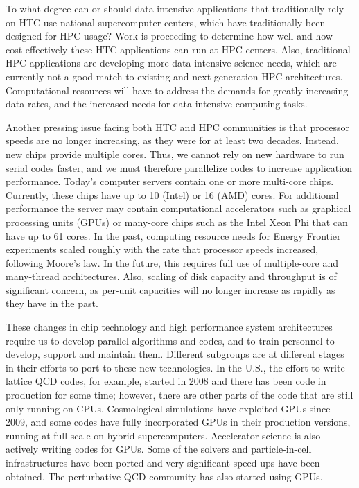 To what degree can or should data-intensive applications that traditionally 
rely on HTC use national supercomputer centers, which have traditionally 
been designed for HPC usage?
Work is proceeding to determine how well and how cost-effectively these HTC
applications can run at HPC centers.
Also, traditional HPC applications are developing more data-intensive
science needs, which are currently not a good match to existing
and next-generation HPC architectures. Computational resources will have to
address the demands for greatly increasing data rates, and the increased
needs for data-intensive computing tasks.

Another pressing issue facing both HTC and HPC communities is that
processor speeds are no longer increasing, as they were for
at least two decades. Instead, new chips provide multiple
cores. Thus, we cannot rely on new hardware to run serial codes faster, and
we must therefore parallelize codes to increase application performance. 
Today's computer servers contain one or more multi-core chips.  Currently,
these chips  have up to 10 (Intel) or 16 (AMD) cores. 
For additional performance the server may contain
computational accelerators such as graphical processing
units (GPUs) or many-core chips such as the Intel Xeon Phi that can have up
to 61 cores. 
In the past, computing resource needs for Energy Frontier experiments scaled
roughly with the rate that processor speeds increased, following Moore's
law. In the future, this requires full use of multiple-core and many-thread 
architectures. Also,
scaling of disk capacity and throughput is of
significant concern, as per-unit capacities will no longer increase as rapidly
as they have in the past.

These changes in chip technology and high performance system architectures
require us to develop parallel algorithms and codes, and to train personnel
to develop, support and maintain them. Different subgroups are at different
stages in their efforts to port to these new technologies. 
In the U.S., the effort to write lattice QCD codes, for
example, started in 2008 and there has been code in
production for some time; however, there
are other parts of the code that are still only running on CPUs.
Cosmological simulations have exploited GPUs since 2009, and some 
codes have fully incorporated GPUs in their production versions, running 
at full scale on hybrid supercomputers.
Accelerator science is also actively writing codes for GPUs. Some of the
solvers and particle-in-cell infrastructures have been ported and very
significant speed-ups have been obtained. The perturbative QCD community
has also started using GPUs.

